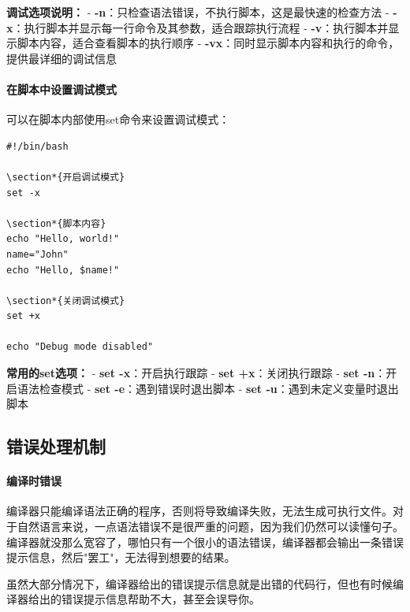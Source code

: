 \documentclass[12pt,UTF8]{ctexbook}
\begin{document}
\textbf{调试选项说明：}
- \textbf{-n}：只检查语法错误，不执行脚本，这是最快速的检查方法
- \textbf{-x}：执行脚本并显示每一行命令及其参数，适合跟踪执行流程
- \textbf{-v}：执行脚本并显示脚本内容，适合查看脚本的执行顺序
- \textbf{-vx}：同时显示脚本内容和执行的命令，提供最详细的调试信息

\paragraph{在脚本中设置调试模式}
可以在脚本内部使用set命令来设置调试模式：

\begin{verbatim}
#!/bin/bash

\section*{开启调试模式}
set -x

\section*{脚本内容}
echo "Hello, world!"
name="John"
echo "Hello, $name!"

\section*{关闭调试模式}
set +x

echo "Debug mode disabled"
\end{verbatim}

\textbf{常用的set选项：}
- \textbf{set -x}：开启执行跟踪
- \textbf{set +x}：关闭执行跟踪
- \textbf{set -n}：开启语法检查模式
- \textbf{set -e}：遇到错误时退出脚本
- \textbf{set -u}：遇到未定义变量时退出脚本

\subsection{错误处理机制}

\paragraph{编译时错误}
编译器只能编译语法正确的程序，否则将导致编译失败，无法生成可执行文件。对于自然语言来说，一点语法错误不是很严重的问题，因为我们仍然可以读懂句子。编译器就没那么宽容了，哪怕只有一个很小的语法错误，编译器都会输出一条错误提示信息，然后"罢工"，无法得到想要的结果。

虽然大部分情况下，编译器给出的错误提示信息就是出错的代码行，但也有时候编译器给出的错误提示信息帮助不大，甚至会误导你。
\end{document}
